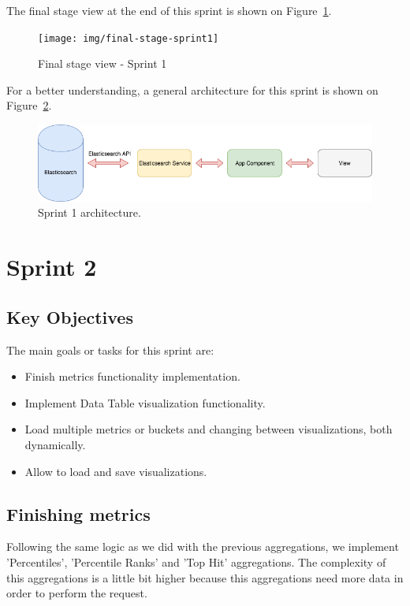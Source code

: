 \documentclass[a4paper, 12pt, english]{book}
\begin{document}
The final stage view at the end of this sprint is shown on Figure~\ref{fig:sprint1-final-stage}.
\begin{figure}
  \centering
  \texttt{[image: img/final-stage-sprint1]}
  \caption{Final stage view - Sprint 1}
  \label{fig:sprint1-final-stage}
\end{figure}

For a better understanding, a general architecture for this sprint is shown on Figure~\ref{fig:sprint1-architecture}.
\begin{figure}
  \centering
  \includegraphics[width=13cm, keepaspectratio]{img/sprint1_architecture}
  \caption{Sprint 1 architecture.}
  \label{fig:sprint1-architecture}
\end{figure}


\section{Sprint 2}
\label{sec:sprint-2}
\subsection{Key Objectives}
\label{sec:key-objectives}

The main goals or tasks for this sprint are:
\begin{itemize}
    \item Finish metrics functionality implementation.
    \item Implement Data Table visualization functionality.
    \item Load multiple metrics or buckets and changing between visualizations, both dynamically.
    \item Allow to load and save visualizations.
\end{itemize}

\subsection{Finishing metrics}
\label{sec:finishing-metrics}
Following the same logic as we did with the previous aggregations, we implement 'Percentiles', 'Percentile Ranks' and 'Top Hit' aggregations. The complexity of this aggregations is a little bit higher because this aggregations need more data in order to perform the request.
\end{document}
